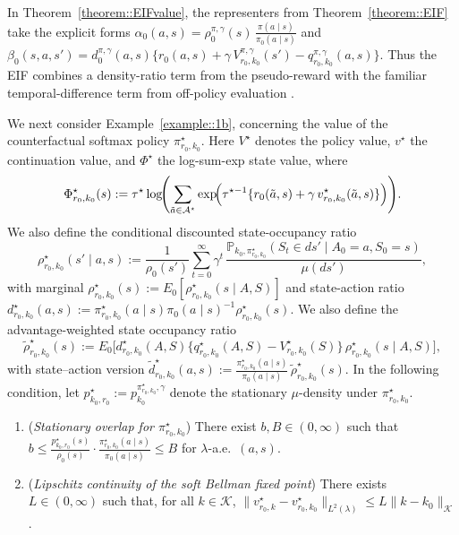 \documentclass[12pt]{article}
\theoremstyle{plain}
\begin{document}
\noindent In Theorem~\ref{theorem::EIFvalue}, the representers from 
Theorem~\ref{theorem::EIF} take the explicit forms
$\alpha_0(a,s) = \rho_0^{\pi,\gamma}(s)\,\tfrac{\pi(a\mid s)}{\pi_0(a\mid s)}$
and 
$\beta_0(s,a,s')
= d_0^{\pi,\gamma}(a,s)\{r_0(a,s) + \gamma\,V_{r_0,k_0}^{\pi,\gamma}(s') 
- q_{r_0,k_0}^{\pi,\gamma}(a,s)\}$.  
Thus the EIF combines a density-ratio term from the pseudo-reward with the
familiar temporal-difference term from off-policy evaluation
\citep{van2018online, kallus2020double, kallus2022efficiently, van2025automaticDRL}.  


 
We next consider Example~\ref{example::1b}, concerning the value of the
counterfactual softmax policy \(\pi_{r_0,k_0}^\star\). Here \(V^\star\)
denotes the policy value, \(v^\star\) the continuation value, and
\(\Phi^\star\) the log-sum-exp state value, where
\[
\Phi_{r_0,k_0}^\star(s)
:= \tau^\star \log\!\Biggl(\sum_{\tilde a \in \mathcal{A}^\star}
\exp\!\Bigl(\tau^{\star-1}\{r_0(\tilde a,s)
+ \gamma\,v_{r_0,k_0}^\star(\tilde a,s)\}\Bigr)\Biggr).
\]
We also define the conditional discounted state-occupancy ratio
\[
\rho_{r_0,k_0}^\star(s'\mid a,s)
:= \frac{1}{\rho_0(s')}\sum_{t=0}^\infty \gamma^t\,
\frac{\mathbb{P}_{k_0,\pi_{r_0,k_0}^\star}(S_t\in ds' \mid A_0=a,S_0=s)}{\mu(ds')},
\]
with marginal \(\rho_{r_0,k_0}^\star(s):=E_0[\rho_{r_0,k_0}^\star(s\mid A,S)]\)
and state-action ratio
\(d_{r_0,k_0}^\star(a,s):=\pi_{r_0,k_0}^\star(a\mid s)\pi_0(a\mid s)^{-1}
\rho_{r_0,k_0}^\star(s)\).
We also define the advantage-weighted state occupancy ratio
\begin{equation} \label{eqn::tilderho}
\widetilde{\rho}_{r_0,k_0}^\star(s)
:= E_0\!\big[d_{r_0,k_0}^\star(A,S)\{q_{r_0,k_0}^\star(A,S)
   - V_{r_0,k_0}^\star(S)\}\,\rho_{r_0,k_0}^\star(s\mid A,S)\big],
\end{equation}
with state--action version
$\widetilde{d}_{r_0,k_0}^\star(a,s)
:= \tfrac{\pi_{r_0,k_0}^\star(a\mid s)}{\pi_0(a\mid s)}\,
   \widetilde{\rho}_{r_0,k_0}^\star(s)$.
In the following condition, let
$p_{k_0, r_0}^{\star} := p_{k_0}^{\pi_{r_0, k_0}^\star, \gamma}$ denote the
stationary $\mu$-density under $\pi_{r_0, k_0}^\star$.



\begin{enumerate}[label=\textbf{(D\arabic*)}, ref=D\arabic*, resume=condexample]
    \item (\textit{Stationary overlap for $\pi_{r_0, k_0}^\star$}) There exist $b, B \in (0,\infty)$ such that $b \le \frac{p_{k_0, r_0}^{\star}(s)}{\rho_0(s)} \cdot \frac{\pi_{r_0, k_0}^\star(a \mid s)}{\pi_0(a \mid s)} \le B$ for $\lambda$-a.e.\ $(a,s)$. \label{cond::stationary3}
    \item (\textit{Lipschitz continuity of the soft Bellman fixed point}) There exists $L\in (0,\infty)$ such that, for all $k \in \mathcal{K}$, $\|v_{r_0,k}^\star - v_{r_0, k_0}^\star\|_{L^2(\lambda)} \le L \|k - k_0\|_{\mathcal{K}}$. \label{cond::lipschitzvalue}
\end{enumerate}
\end{document}
